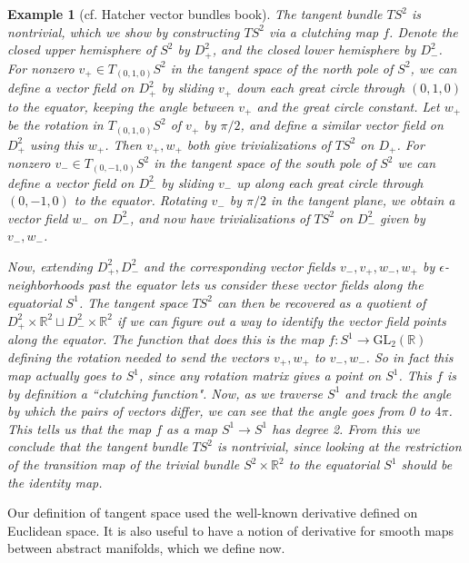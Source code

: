 \documentclass{amsart}          %
\newtheorem{example}[theorem]{Example}
\newcommand{\R}{\mathbb R}
\begin{document}
\begin{example}[cf. Hatcher vector bundles book]
	The tangent bundle $TS^2$ is nontrivial, which we show by constructing $TS^2$ via a clutching map $f$. Denote the closed upper hemisphere of $S^2$ by $D_+^2$, and the closed lower hemisphere by $D_-^2$. For nonzero $v_+\in T_{(0,1,0)}S^2$ in the tangent space of the north pole of $S^2$, we can define a vector field on $D_+^2$ by sliding $v_+$ down each great circle through $(0,1,0)$ to the equator, keeping the angle between $v_+$ and the great circle constant. Let $w_+$ be the rotation in $T_{(0,1,0)}S^2$ of $v_+$ by $\pi/2$, and define a similar vector field on $D^2_+$ using this $w_+$. Then $v_+,w_+$ both give trivializations of $TS^2$ on $D_+$. For nonzero $v_-\in T_{(0,-1,0)}S^2$ in the tangent space of the south pole of $S^2$ we can define a vector field on $D_-^2$ by sliding $v_-$ up along each great circle through $(0,-1,0)$ to the equator. Rotating $v_-$ by $\pi/2$ in the tangent plane, we obtain a vector field $w_-$ on $D^2_-$, and now have trivializations of $TS^2$ on $D_-^2$ given by $v_-,w_-$. 
	
	Now, extending $D_+^2,D_-^2$ and the corresponding vector fields $v_-,v_+,w_-,w_+$ by $\epsilon$-neighborhoods past the equator lets us consider these vector fields along the equatorial $S^1$. The tangent space $TS^2$ can then be recovered as a quotient of $D_+^2\times\R^2\sqcup D_-^2\times\R^2$ if we can figure out a way to identify the vector field points along the equator. The function that does this is the map $f:S^1\to\text{GL}_2(\R)$ defining the rotation needed to send the vectors $v_+,w_+$ to $v_-,w_-$. So in fact this map actually goes to $S^1$, since any rotation matrix gives a point on $S^1$. This $f$ is by definition a ``clutching function". Now, as we traverse $S^1$ and track the angle by which the pairs of vectors differ, we can see that the angle goes from 0 to $4\pi$. This tells us that the map $f$ as a map $S^1\to S^1$ has degree 2. From this we conclude that the tangent bundle $TS^2$ is nontrivial, since looking at the restriction of the transition map of the trivial bundle $S^2\times\R^2$ to the equatorial $S^1$ should be the identity map.
\end{example}
Our definition of tangent space used the well-known derivative defined on Euclidean space. It is also useful to have a notion of derivative for smooth maps between abstract manifolds, which we define now.
\end{document}
